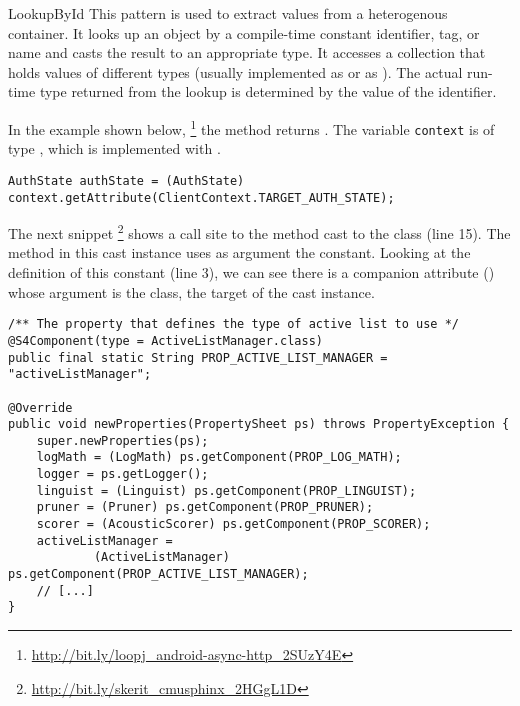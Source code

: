 \begin{pattern}{LookupById}
This pattern is used to extract values from a heterogenous container.
It looks up an object by a compile-time constant identifier, tag, or name and casts the result to an appropriate type.
It accesses a collection that holds values of different types
(usually implemented as  or as ).
The actual run-time type returned from the lookup is determined by the value of the identifier.

\instances{}
In the example shown below,%
\footnote{\url{http://bit.ly/loopj_android-async-http_2SUzY4E}}
the  method returns .
The variable \texttt{context} is of type ,
which is implemented with .

\begin{verbatim}
AuthState authState = (AuthState) context.getAttribute(ClientContext.TARGET_AUTH_STATE);
\end{verbatim}

The next snippet%
\footnote{\url{http://bit.ly/skerit_cmusphinx_2HGgL1D}}
shows a call site to the  method cast to the  class (line 15).
The  method in this cast instance uses as argument the  constant.
Looking at the definition of this constant (line 3),
we can see there is a companion attribute () whose argument is the  class, the target of the cast instance.

\begin{verbatim}
/** The property that defines the type of active list to use */
@S4Component(type = ActiveListManager.class)
public final static String PROP_ACTIVE_LIST_MANAGER = "activeListManager";

@Override
public void newProperties(PropertySheet ps) throws PropertyException {
    super.newProperties(ps);
    logMath = (LogMath) ps.getComponent(PROP_LOG_MATH);
    logger = ps.getLogger();
    linguist = (Linguist) ps.getComponent(PROP_LINGUIST);
    pruner = (Pruner) ps.getComponent(PROP_PRUNER);
    scorer = (AcousticScorer) ps.getComponent(PROP_SCORER);
    activeListManager = 
            (ActiveListManager) ps.getComponent(PROP_ACTIVE_LIST_MANAGER);
    // [...]
}
\end{verbatim}


\end{pattern}
